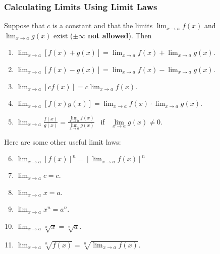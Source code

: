 \begin{frame}
\frametitle{Calculating Limits Using Limit Laws}
\begin{theorem}
Suppose that $c$ is a constant and that the limits %
$\displaystyle \lim_{x\rightarrow a} f(x)$ and $\displaystyle \lim_{x\rightarrow a}g(x)$ %
exist ($\pm\infty$ \textbf{not allowed}).  Then
\begin{enumerate}
\item<1-| alert@2>  $\displaystyle \lim_{x\rightarrow a}[f(x) + g(x)] = \lim_{x\rightarrow a} f(x) + \lim_{x\rightarrow a} g(x)$.
\item<1-| alert@3>  $\displaystyle \lim_{x\rightarrow a}[f(x) - g(x)] = \lim_{x\rightarrow a} f(x) - \lim_{x\rightarrow a} g(x)$.
\item<1-| alert@4>  $\displaystyle \lim_{x\rightarrow a}[cf(x)] = c\lim_{x\rightarrow a} f(x)$. 
\item<1-| alert@5>  $\displaystyle \lim_{x\rightarrow a}[f(x)g(x)] = \lim_{x\rightarrow a} f(x) \cdot \lim_{x\rightarrow a} g(x)$.
\item<1-| alert@6>  $\displaystyle \lim_{x\rightarrow a}\frac{f(x)}{g(x)} = \frac{\lim\limits_{x\rightarrow a} f(x)}{\lim\limits_{x\rightarrow a} g(x)}$ \ if \ $\displaystyle \lim\limits_{x\rightarrow a}g(x) \neq 0$.
\end{enumerate}
\end{theorem}
\alert<2->{
}
\end{frame}


\begin{frame}
Here are some other useful limit laws:

\begin{enumerate}
\setcounter{enumi}{5}
\item<1-| alert@2> $\displaystyle \lim_{x\rightarrow a} [f(x)]^n = [\lim_{x\rightarrow a} f(x)]^n$
\item<1-| alert@4> $\displaystyle \lim_{x\rightarrow a} c = c$.
\item<1-| alert@4> $\displaystyle \lim_{x\rightarrow a} x = a$.
\item<1-| alert@4> $\displaystyle \lim_{x\rightarrow a} x^n = a^n$.
\item<1-| alert@4> $\displaystyle \lim_{x\rightarrow a} \sqrt[n]{x} = \sqrt[n]{a}$.
\item<1-| alert@3> $\displaystyle \lim_{x\rightarrow a} \sqrt[n]{f(x)} = \sqrt[n]{\lim_{x\rightarrow a}f(x)}$. 
\end{enumerate}
\alert{
}
\end{frame}
